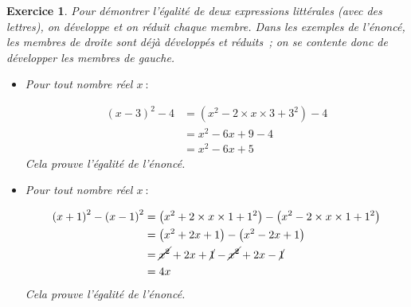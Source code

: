 \documentclass[10pt]{article}
\newtheorem{exo}{Exercice}
\begin{document}
\begin{exo}

Pour démontrer l'égalité de deux expressions littérales (avec des lettres), on développe et on réduit chaque membre. Dans les exemples de l'énoncé, les membres de droite sont déjà développés et réduits~; on se contente donc de développer les membres de gauche.

\medskip

\begin{itemize}
\item[\textbullet] Pour tout nombre réel $x~:$

\begin{align*}\left(x-3\right)^2-4
&=\left(x^2-2\times x\times 3+3^2\right)-4
\\&=x^2-6x+9-4
\\&=x^2-6x+5\end{align*}
Cela prouve l'égalité de l'énoncé.
\item[\textbullet] Pour tout nombre réel $x~:$

\begin{align*}\left(x+1\right)^2-\left(x-1\right)^2
&=\left(x^2+2\times x\times 1+1^2\right)-\left(x^2-2\times x\times 1+1^2\right)
\\&=\left(x^2+2x+1\right)-\left(x^2-2x+1\right)
\\&=\cancel{x^2}+2x+\cancel{1}-\cancel{x^2}+2x-\cancel{1}
\\&=4x
\end{align*}
Cela prouve l'égalité de l'énoncé.

\end{itemize}



\end{exo}
\end{document}
